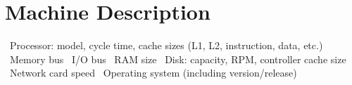 \section{Machine Description}


\ Processor: model, cycle time, cache sizes (L1, L2, instruction, data, etc.)
\ Memory bus
\ I/O bus
\ RAM size
\ Disk: capacity, RPM, controller cache size
\ Network card speed
\ Operating system (including version/release)
